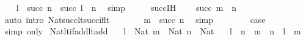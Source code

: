 \begin{isabellebody}
\ \ \isamarkupfalse%
\ {\isachardoublequoteopen}l\ {\isacharplus}{\kern0pt}\ succ\ n\ {\isacharequal}{\kern0pt}\ succ\ {\isacharparenleft}{\kern0pt}l\ {\isacharplus}{\kern0pt}\ n{\isacharparenright}{\kern0pt}{\isachardoublequoteclose}\ \isamarkupfalse%
\ simp\isanewline
\ \ \isamarkupfalse%
\ \isamarkupfalse%
\ succ{\isachardot}{\kern0pt}IH\ \isamarkupfalse%
\ {\isachardoublequoteopen}{\isachardot}{\kern0pt}{\isachardot}{\kern0pt}{\isachardot}{\kern0pt}\ {\isacharless}{\kern0pt}\ succ\ {\isacharparenleft}{\kern0pt}m\ {\isacharplus}{\kern0pt}\ n{\isacharparenright}{\kern0pt}{\isachardoublequoteclose}\isanewline
\ \ \ \ \isamarkupfalse%
\ {\isacharparenleft}{\kern0pt}auto\ intro{\isacharcolon}{\kern0pt}\ Nat{\isacharunderscore}{\kern0pt}succ{\isacharunderscore}{\kern0pt}lt{\isacharunderscore}{\kern0pt}succ{\isacharunderscore}{\kern0pt}if{\isacharunderscore}{\kern0pt}lt{\isacharparenright}{\kern0pt}\isanewline
\ \ \isamarkupfalse%
\ \isamarkupfalse%
\ {\isachardoublequoteopen}{\isachardot}{\kern0pt}{\isachardot}{\kern0pt}{\isachardot}{\kern0pt}\ {\isacharequal}{\kern0pt}\ m\ {\isacharplus}{\kern0pt}\ succ\ n{\isachardoublequoteclose}\ \isamarkupfalse%
\ simp\isanewline
\ \ \isanewline
\ \ \isamarkupfalse%
\ \isamarkupfalse%
\ {\isachardoublequoteopen}{\isacharquery}{\kern0pt}case{\isachardoublequoteclose}\ \isamarkupfalse%
\ {\isacharparenleft}{\kern0pt}simp\ only{\isacharcolon}{\kern0pt}{\isacharparenright}{\kern0pt}\isanewline
{}\isamarkupfalse%
%
\endisatagproof
{\isafoldproof}%
%
\isadelimproof
\isanewline
%
\endisadelimproof
\isanewline
{}\isamarkupfalse%
\ Nat{\isacharunderscore}{\kern0pt}lt{\isacharunderscore}{\kern0pt}if{\isacharunderscore}{\kern0pt}add{\isacharunderscore}{\kern0pt}lt{\isacharunderscore}{\kern0pt}add{\isacharcolon}{\kern0pt}\isanewline
\ \ \ {\isachardoublequoteopen}l\ {\isacharcolon}{\kern0pt}\ Nat{\isachardoublequoteclose}\ {\isachardoublequoteopen}m\ {\isacharcolon}{\kern0pt}\ Nat{\isachardoublequoteclose}\ {\isachardoublequoteopen}n\ {\isacharcolon}{\kern0pt}\ Nat{\isachardoublequoteclose}\isanewline
\ \ \ {\isachardoublequoteopen}l\ {\isacharplus}{\kern0pt}\ n\ {\isacharless}{\kern0pt}\ m\ {\isacharplus}{\kern0pt}\ n\ {\isasymLongrightarrow}\ l\ {\isacharless}{\kern0pt}\ m{\isachardoublequoteclose}\isanewline
%
\isadelimproof
%
\endisadelimproof
%
\isatagproof

\end{isabellebody}
